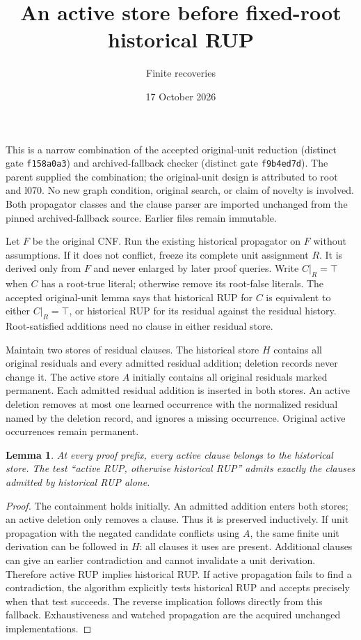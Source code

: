 \documentclass[11pt]{article}
\title{An active store before fixed-root historical RUP}
\author{Finite recoveries}
\date{17 October 2026}
\newtheorem{lemma}{Lemma}
\begin{document}
\maketitle
This is a narrow combination of the accepted original-unit reduction
(distinct gate \texttt{f158a0a3}) and archived-fallback checker
(distinct gate \texttt{f9b4ed7d}). The parent supplied the combination;
the original-unit design is attributed to root and l070.
No new graph condition, original search, or claim of novelty is involved.
Both propagator classes and the clause parser are imported unchanged from
the pinned archived-fallback source. Earlier files remain immutable.

Let $F$ be the original CNF. Run the existing historical propagator on $F$
without assumptions. If it does not conflict, freeze its complete unit
assignment $R$. It is derived only from $F$ and never enlarged by later proof
queries. Write $C|_R=\top$ when $C$ has a root-true literal; otherwise remove
its root-false literals. The accepted original-unit lemma says that historical
RUP for $C$ is equivalent to either $C|_R=\top$, or historical RUP for its
residual against the residual history. Root-satisfied additions need no clause
in either residual store.

Maintain two stores of residual clauses. The historical store $H$ contains
all original residuals and every admitted residual addition; deletion records
never change it. The active store $A$ initially contains all original residuals
marked permanent. Each admitted residual addition is inserted in both stores.
An active deletion removes at most one learned occurrence with the normalized
residual named by the deletion record, and ignores a missing occurrence.
Original active occurrences remain permanent.

\begin{lemma}
At every proof prefix, every active clause belongs to the historical store.
The test ``active RUP, otherwise historical RUP'' admits exactly the clauses
admitted by historical RUP alone.
\end{lemma}
\begin{proof}
The containment holds initially. An admitted addition enters both stores;
an active deletion only removes a clause. Thus it is preserved inductively.
If unit propagation with the negated candidate conflicts using $A$, the same
finite unit derivation can be followed in $H$: all clauses it uses are present.
Additional clauses can give an earlier contradiction and cannot invalidate a
unit derivation. Therefore active RUP implies historical RUP.
If active propagation fails to find a contradiction, the algorithm explicitly
tests historical RUP and accepts precisely when that test succeeds. The reverse
implication follows directly from this fallback. Exhaustiveness and watched
propagation are the acquired unchanged implementations.
\end{proof}
\end{document}
